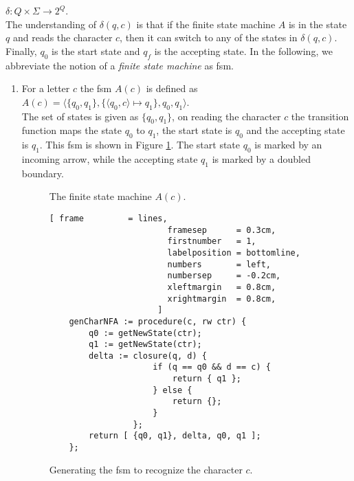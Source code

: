$\delta: Q \times \Sigma \rightarrow 2^Q$.
\\[0.2cm]
The understanding  of $\delta(q,c)$ is that if the finite state machine $A$ is in the
state $q$ and reads the character $c$, then it can switch to any of the states in
$\delta(q,c)$.
Finally, $q_0$ is the start state and $q_f$ is the accepting state.  In the following, we
abbreviate the notion of a  
\emph{finite state machine} as fsm.
\begin{enumerate}
\item For a letter $c$ the fsm $A(c)$ is defined as
      \\[0.2cm]
      \hspace*{1.3cm}
      $A(c) = \langle \{ q_0, q_1 \}, 
                      \{ \langle q_0, c \rangle \mapsto q_1\}, q_0, q_1  \rangle$.
      \\[0.2cm]
      The set of states is given as $\{ q_0, q_1 \}$, on reading the character $c$ the
      transition function maps the state $q_0$ to $q_1$, the start state is $q_0$ and the
      accepting state is $q_1$.  This fsm is shown in Figure
      \ref{fig:aChar.eps}.  The start state $q_0$ is marked by an incoming arrow, while the
      accepting state $q_1$ is marked by a doubled boundary. 

      \begin{figure}[!ht]
        \centering
      \caption{The finite state machine $A(c)$.}
      \label{fig:aChar.eps}
      \end{figure}

      \begin{figure}[!ht]
      \centering
      \begin{Verbatim}[ frame         = lines, 
                        framesep      = 0.3cm, 
                        firstnumber   = 1,
                        labelposition = bottomline,
                        numbers       = left,
                        numbersep     = -0.2cm,
                        xleftmargin   = 0.8cm,
                        xrightmargin  = 0.8cm,
                      ]
    genCharNFA := procedure(c, rw ctr) {
        q0 := getNewState(ctr);
        q1 := getNewState(ctr);
        delta := closure(q, d) { 
                     if (q == q0 && d == c) { 
                         return { q1 };
                     } else { 
                         return {};
                     }
                 };
        return [ {q0, q1}, delta, q0, q1 ];
    };
      \end{Verbatim}
      \vspace*{-0.3cm}
      \caption{Generating the fsm to recognize the character $c$.}
      \label{fig:genCharNFA.stlx}
      \end{figure}


\end{enumerate}
